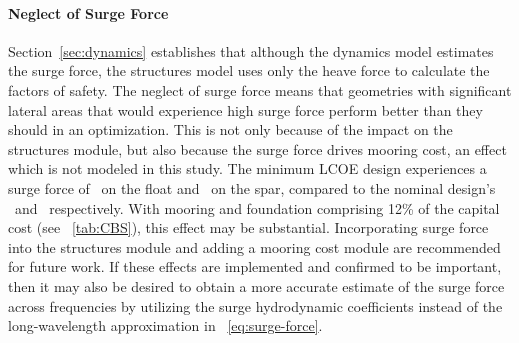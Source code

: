 \paragraph{Neglect of Surge Force}
Section~\ref{sec:dynamics} establishes that although the dynamics model estimates the surge force, the structures model uses only the heave force to calculate the factors of safety.
The neglect of surge force means that geometries with significant lateral areas that would experience high surge force perform better than they should in an optimization.
This is not only because of the impact on the structures module, but also because the surge force drives mooring cost, an effect which is not modeled in this study.
The minimum LCOE design experiences a surge force of \surgeForceFloatAtMinLCOE~on the float and \surgeForceSparAtMinLCOE~on the spar, compared to the nominal design's \surgeForceFloatNominal~and \surgeForceSparNominal~respectively.
With mooring and foundation comprising 12\% of the capital cost (see \tableautorefname~\ref{tab:CBS}), this effect may be substantial.
Incorporating surge force into the structures module and adding a mooring cost module are recommended for future work.
If these effects are implemented and confirmed to be important, then it may also be desired to obtain a more accurate estimate of the surge force across frequencies by utilizing the surge hydrodynamic coefficients instead of the long-wavelength approximation in \equationautorefname~\ref{eq:surge-force}. 

